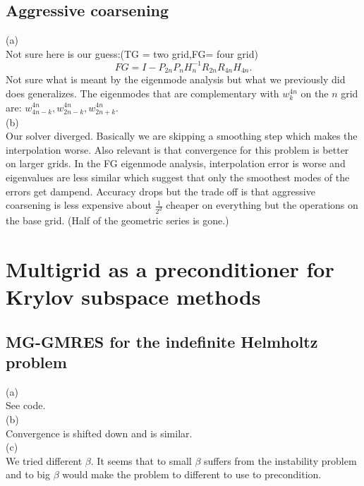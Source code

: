 \documentclass[a4paper,12pt]{article}
\begin{document}
\subsection{Aggressive coarsening}
(a)\\
Not sure here is our guess:(TG = two grid,FG= four grid)
\begin{equation}
    FG = I -P_{2n} P_{n} H_{n}^{-1} R_{2n} R_{4n} H_{4n}.
\end{equation}
Not sure what is meant by the eigenmode analysis but what we previously
did does generalizes. The eigenmodes that are complementary with $w_{k}^{4n}$ on
the $n$ grid are: $w_{4n-k}^{4n},w_{2n-k}^{4n},w_{2n+k}^{4n}$. \\
(b)\\
Our solver diverged. Basically we are skipping a smoothing step which
makes the interpolation worse. Also relevant is that convergence
for this problem is better on larger grids. In the FG eigenmode analysis, interpolation error is worse
and eigenvalues are less similar which suggest that only the smoothest modes of the errors get dampend.
Accuracy drops but the trade off is that aggressive coarsening is less expensive about $\frac{1}{2^{d}}$
cheaper on everything but the operations on the base grid. (Half of the geometric series is gone.)

\section{Multigrid as a preconditioner for Krylov subspace methods}

\subsection{MG-GMRES for the indefinite Helmholtz problem}
(a) \\
See code.\\
(b) \\
Convergence is shifted down and is similar.\\
(c) \\
We tried different $\beta$. It seems that to small $\beta$ suffers from the instability problem and
to big $\beta$ would make the problem to different to use to precondition.
\end{document}
